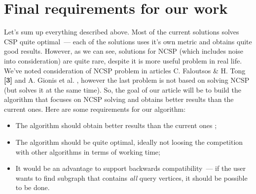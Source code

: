 \section{Final requirements for our work}

Let's sum up everything described above. Most of the current solutions solves CSP quite optimal~--- each of the solutions uses it's own metric and obtains quite good results. However, as we can see, solutions for NCSP (which includes noise into consideration) are quite rare, despite it is more useful problem in real life. We've noted consideration of NCSP problem in articles C. Faloutsos \& H. Tong \textbf{[3]} and A. Gionis et al. \cite{Gionis15}, however the last problem is not based on solving NCSP (but solves it at the same time). So, the goal of our article will be to build the algorithm that focuses on NCSP solving and obtains better results than the current ones. Here are some requirements for our algorithm:

\begin{itemize}
    \item The algorithm should obtain better results than the current ones \cite{Faloutsos06, Gionis15, Barbieri15};
    \item The algorithm should be quite optimal, ideally not loosing the competition with other algorithms in terms of working time;
    \item It would be an advantage to support backwards compatibility~--- if the user wants to find subgraph that contains \textit{all} query vertices, it should be possible to be done.
\end{itemize}
